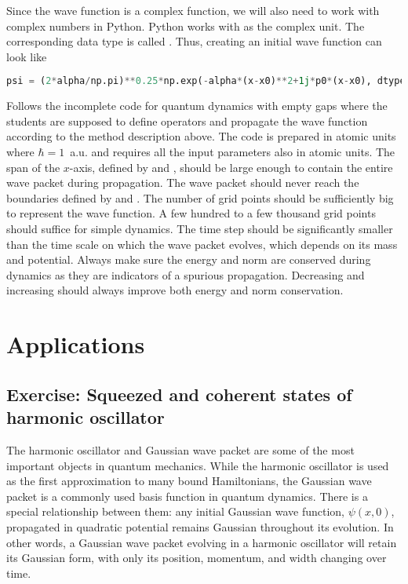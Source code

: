 Since the wave function is a complex function, we will also need to work with complex numbers in Python. Python works with  as the complex unit. The corresponding data type is called . Thus, creating an initial wave function can look like 
\begin{lstlisting}[language=Python, style=mystyle2]
psi = (2*alpha/np.pi)**0.25*np.exp(-alpha*(x-x0)**2+1j*p0*(x-x0), dtype=complex)
\end{lstlisting}

Follows the incomplete code for quantum dynamics with empty gaps where the students are supposed to define operators and propagate the wave function according to the method description above. The code is prepared in atomic units where $\hbar=1$~a.u. and requires all the input parameters also in atomic units. The span of the $x$-axis, defined by  and , should be large enough to contain the entire wave packet during propagation. The wave packet should never reach the boundaries defined by  and . The number of grid points should be sufficiently big to represent the wave function. A few hundred to a few thousand grid points should suffice for simple dynamics. The time step  should be significantly smaller than the time scale on which the wave packet evolves, which depends on its mass and potential. Always make sure the energy and norm are conserved during dynamics as they are indicators of a spurious propagation. Decreasing  and increasing  should always improve both energy and norm conservation. 

\lstset{style=mystyle}


\section{Applications}

\subsection*{Exercise: Squeezed and coherent states of harmonic oscillator}

The harmonic oscillator and Gaussian wave packet are some of the most important objects in quantum mechanics. While the harmonic oscillator is used as the first approximation to many bound Hamiltonians, the Gaussian wave packet is a commonly used basis function in quantum dynamics. There is a special relationship between them: any initial Gaussian wave function, $\psi(x,0)$, propagated in quadratic potential remains Gaussian throughout its evolution. In other words, a Gaussian wave packet evolving in a harmonic oscillator will retain its Gaussian form, with only its position, momentum, and width changing over time.

